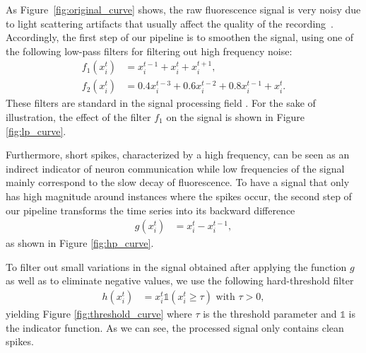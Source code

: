 \documentclass[wcp]{jmlr}
\begin{document}
As Figure~\ref{fig:original_curve} shows, the raw
fluorescence signal is very noisy due to light scattering artifacts that
usually affect the quality of the recording~\citep{lichtman2011big}.
Accordingly, the first step of our pipeline is to smoothen the signal, using
one of the following low-pass filters for filtering out high frequency noise:
\begin{align}
f_1(x^t_i) &= x^{t-1}_i + x^t_i + x^{t+1}_i, \label{eq:symetric-median} \\
f_2(x^t_i) &= 0.4 x^{t-3}_i + 0.6 x^{t-2}_i + 0.8 x^{t-1}_i + x_i^t.
\label{eq:weighted-asymetric-median}
\end{align}
These filters are standard in the signal processing field \citep{kaiser1977data, oppenheim1983signals}. For the sake of illustration, the effect of the filter $f_1$ on the signal
is shown in Figure \ref{fig:lp_curve}.

Furthermore, short spikes, characterized by a high
frequency, can be seen as an indirect indicator of neuron communication while low frequencies of the signal mainly correspond to the slow
decay of fluorescence. To have a signal that only has high magnitude around instances where the spikes occur, the second step of our pipeline transforms the time series into its backward
difference
\begin{align}
g(x^{t}_{i}) &= x^{t}_i - x^{t-1}_i, \label{eq:high-pass-filter}
\end{align}
as shown in Figure \ref{fig:hp_curve}.

To filter out small variations in the signal obtained after applying the
function $g$ as well as to eliminate negative values, we use the following
hard-threshold filter
\begin{align}\label{eqn:hfilter}
h(x^{t}_i) &= x^{t}_i \mathbb{1}(x^{t}_i \geq \tau) \text{ with } \tau > 0,
\end{align}
yielding Figure \ref{fig:threshold_curve} where $\tau$ is the threshold parameter and $\mathbb{1}$ is the indicator function.
As we can see, the processed signal only contains clean spikes.
\end{document}

